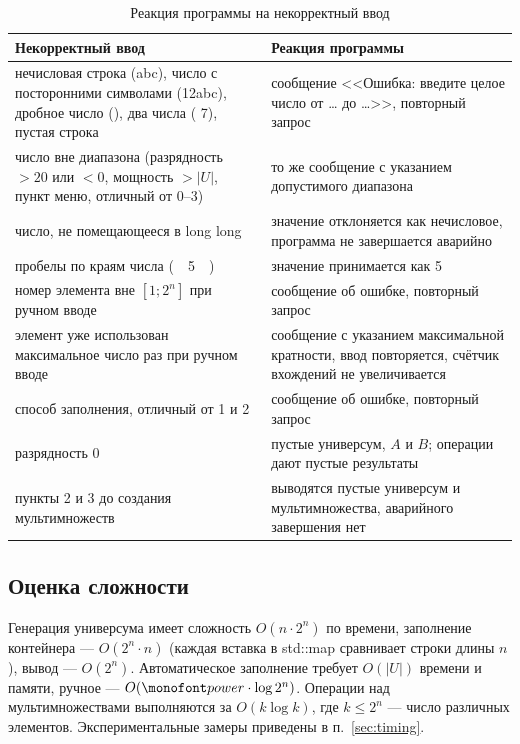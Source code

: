 \documentclass[14pt,a4paper]{extarticle}
\newcommand{\card}[1]{\left|#1\right|}
\newcommand{\code}[1]{{\monofont #1}}
\begin{document}
\begin{table}[H]
\caption{Реакция программы на некорректный ввод}\label{tab:errors}
\small\singlespacing
\begin{tabularx}{\textwidth}{@{}>{\raggedright\arraybackslash}p{6.3cm}X@{}}
\toprule
Некорректный ввод & Реакция программы \\
\midrule
нечисловая строка (\code{abc}), число с посторонними символами (\code{12abc}), дробное число (\code{1.5}), два числа (\code{3 7}), пустая строка & сообщение <<Ошибка: введите целое число от \ldots{} до \ldots{}>>, повторный запрос \\
число вне диапазона (разрядность $>20$ или $<0$, мощность $>\card{U}$, пункт меню, отличный от 0--3) & то же сообщение с указанием допустимого диапазона \\
число, не помещающееся в \code{long long} & значение отклоняется как нечисловое, программа не завершается аварийно \\
пробелы по краям числа (\code{\ \ 5\ \ }) & значение принимается как 5 \\
номер элемента вне $[1;2^n]$ при ручном вводе & сообщение об ошибке, повторный запрос \\
элемент уже использован максимальное число раз при ручном вводе & сообщение с указанием максимальной кратности, ввод повторяется, счётчик вхождений не увеличивается \\
способ заполнения, отличный от 1 и 2 & сообщение об ошибке, повторный запрос \\
разрядность 0 & пустые универсум, $A$ и $B$; операции дают пустые результаты \\
пункты 2 и 3 до создания мультимножеств & выводятся пустые универсум и мультимножества, аварийного завершения нет \\
\bottomrule
\end{tabularx}
\end{table}

\subsection{Оценка сложности}

Генерация универсума имеет сложность $O(n\cdot 2^n)$ по времени, заполнение контейнера --- $O(2^n\cdot n)$ (каждая вставка в \code{std::map} сравнивает строки длины $n$), вывод --- $O(2^n)$. Автоматическое заполнение требует $O(\card{U})$ времени и памяти, ручное --- $O(\code{power}\cdot\log 2^n)$. Операции над мультимножествами выполняются за $O(k\log k)$, где $k\le 2^n$ --- число различных элементов. Экспериментальные замеры приведены в п.~\ref{sec:timing}.
\end{document}
